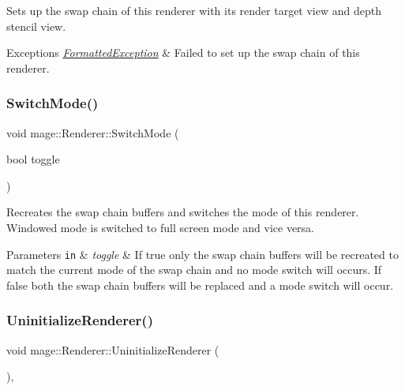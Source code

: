 Sets up the swap chain of this renderer with its render target view and depth stencil view.


\begin{DoxyExceptions}{Exceptions}
{\em \hyperlink{structmage_1_1_formatted_exception}{Formatted\+Exception}} & Failed to set up the swap chain of this renderer. \\
\hline
\end{DoxyExceptions}
\hypertarget{classmage_1_1_renderer_a9004ab608659188900c808eacb5f873c}{}\label{classmage_1_1_renderer_a9004ab608659188900c808eacb5f873c} 
\subsubsection{\texorpdfstring{Switch\+Mode()}{SwitchMode()}}
{\footnotesize\ttfamily void mage\+::\+Renderer\+::\+Switch\+Mode (\begin{DoxyParamCaption}\item[{bool}]{toggle }\end{DoxyParamCaption})}

Recreates the swap chain buffers and switches the mode of this renderer. Windowed mode is switched to full screen mode and vice versa.


\begin{DoxyParams}[1]{Parameters}
\mbox{\tt in}  & {\em toggle} & If {\ttfamily true} only the swap chain buffers will be recreated to match the current mode of the swap chain and no mode switch will occurs. If {\ttfamily false} both the swap chain buffers will be replaced and a mode switch will occur. \\
\hline
\end{DoxyParams}
\hypertarget{classmage_1_1_renderer_a28c76b49e51e49e58fdeb0b72b12f3b6}{}\label{classmage_1_1_renderer_a28c76b49e51e49e58fdeb0b72b12f3b6} 
\subsubsection{\texorpdfstring{Uninitialize\+Renderer()}{UninitializeRenderer()}}
{\footnotesize\ttfamily void mage\+::\+Renderer\+::\+Uninitialize\+Renderer (\begin{DoxyParamCaption}{ }\end{DoxyParamCaption})\hspace{0.3cm}{\ttfamily [private]}, {\ttfamily [noexcept]}}

